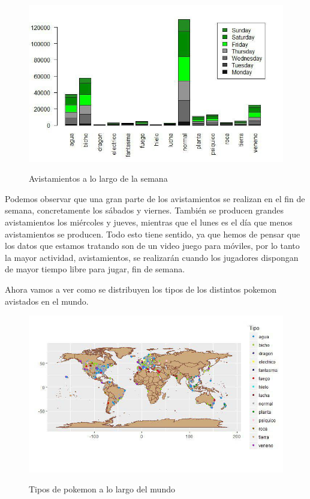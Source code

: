 \begin{figure}[H] %
\centering
\includegraphics[scale=0.8]{img/semana.jpg}  %
\label{img/semana.jpg}
\caption{Avistamientos a lo largo de la semana}
\end{figure}

Podemos observar que una gran parte de los avistamientos se realizan en el fin de semana, concretamente los sábados y viernes. También se producen grandes avistamientos los miércoles y jueves, mientras que el lunes es el día que menos avistamientos se producen. Todo esto tiene sentido, ya que hemos de pensar que los datos que estamos tratando son de un video juego para móviles, por lo tanto la mayor actividad, avistamientos, se realizarán cuando los jugadores dispongan de mayor tiempo libre para jugar, fin de semana.

Ahora vamos a ver como se distribuyen los tipos de los distintos pokemon avistados en el mundo.

\begin{figure}[H] %
\centering
\includegraphics[scale=0.8]{img/tiposmundo.jpg}  %
\label{img/tiposmundo.jpg}
\caption{Tipos de pokemon a lo largo del mundo}
\end{figure}

